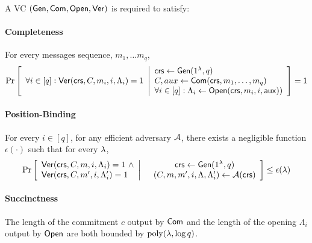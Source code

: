 \begin{definition} \label{def:VC}
A VC $(\mathsf{Gen}, \mathsf{Com}, \mathsf{Open}, \mathsf{Ver})$ is required to satisfy:
\vspace{-1ex}
\paragraph{Completeness}

For every messages sequence, $m_1,\ldots m_q$,
\begin{gather*}
    \underset{}{\text{Pr}}\left [
    \begin{array}{ll}
    \forall i\in [q]: 
         \mathsf{Ver}(\mathsf{crs}, C, m_i, i, \Lambda_i) = 1
    \end{array}
    \middle\vert
    \begin{array}{ll}
         \mathsf{crs} \leftarrow \mathsf{Gen}(1^\lambda, q)\\
         C, aux\leftarrow\mathsf{Com}(\mathsf{crs}, m_1,\ldots,m_q) \\
         \forall i\in [q]: \Lambda_i \leftarrow \mathsf{Open}(\mathsf{crs}, m_i, i, \mathsf{aux}))
    \end{array}
    \right ] = 1
\end{gather*}
\vspace{-3ex}
\paragraph{Position-Binding} For every $i\in [q]$, for any efficient adversary $\mathcal{A}$, there exists a negligible function $\epsilon(\cdot)$ such that for every $\lambda$, %
\begin{gather*}
    \underset{}{\text{Pr}}\left [
    \begin{array}{ll}
    \mathsf{Ver}(\mathsf{crs}, C, m, i, \Lambda_i) = 1 \ \wedge \\
    \mathsf{Ver}(\mathsf{crs}, C, m', i, \Lambda_i') = 1
    \end{array}
    \middle\vert
    \begin{array}{cc}
         &  \mathsf{crs} \leftarrow \mathsf{Gen}(1^\lambda, q)\\
         & (C, m, m', i, \Lambda, \Lambda_i')\leftarrow\mathcal{A}(\mathsf{crs})
    \end{array}
    \right ] \leq \epsilon(\lambda)
\end{gather*}

\vspace{-1ex}
\paragraph{Succinctness}
The length of the commitment $c$ output by $\mathsf{Com}$ and the length of the opening $\Lambda_i$ output by $\mathsf{Open}$ are both bounded by $\operatorname{poly}(\lambda, \log q)$.
\end{definition}


